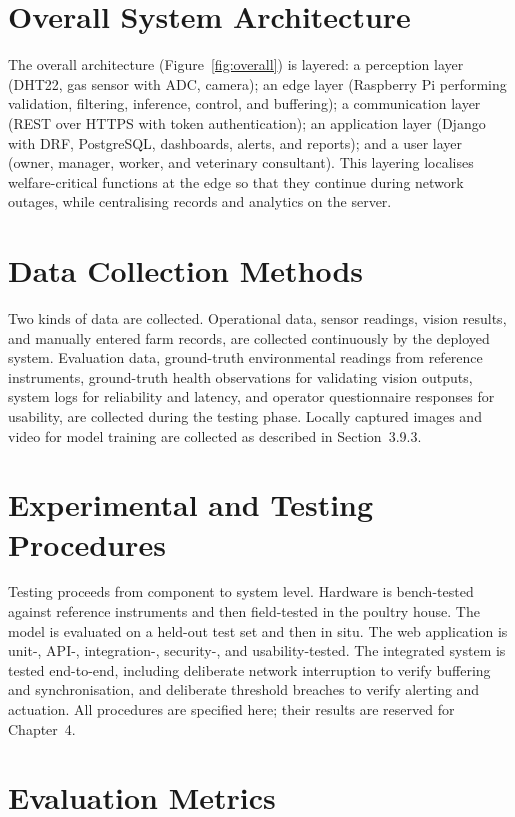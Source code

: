 \documentclass[12pt,a4paper]{report}
\begin{document}
\section{Overall System Architecture}

The overall architecture (Figure~\ref{fig:overall}) is layered: a perception layer (DHT22, gas sensor with ADC, camera); an edge layer (Raspberry Pi performing validation, filtering, inference, control, and buffering); a communication layer (REST over HTTPS with token authentication); an application layer (Django with DRF, PostgreSQL, dashboards, alerts, and reports); and a user layer (owner, manager, worker, and veterinary consultant). This layering localises welfare-critical functions at the edge so that they continue during network outages, while centralising records and analytics on the server.

\section{Data Collection Methods}

Two kinds of data are collected. Operational data, sensor readings, vision results, and manually entered farm records, are collected continuously by the deployed system. Evaluation data, ground-truth environmental readings from reference instruments, ground-truth health observations for validating vision outputs, system logs for reliability and latency, and operator questionnaire responses for usability, are collected during the testing phase. Locally captured images and video for model training are collected as described in Section~3.9.3.

\section{Experimental and Testing Procedures}

Testing proceeds from component to system level. Hardware is bench-tested against reference instruments and then field-tested in the poultry house. The model is evaluated on a held-out test set and then in situ. The web application is unit-, API-, integration-, security-, and usability-tested. The integrated system is tested end-to-end, including deliberate network interruption to verify buffering and synchronisation, and deliberate threshold breaches to verify alerting and actuation. All procedures are specified here; their results are reserved for Chapter~4.

\section{Evaluation Metrics}
\end{document}
